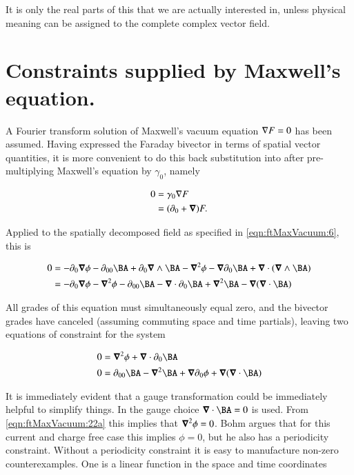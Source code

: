 It is only the real parts of this that we are actually interested in, unless physical meaning can be assigned to the complete complex vector field.

\section{Constraints supplied by Maxwell's equation.}

A Fourier transform solution of Maxwell's vacuum equation $\nabla F = 0$ has been assumed.  Having expressed the Faraday bivector in terms of spatial vector quantities, it is more convenient to do this back substitution into after pre-multiplying Maxwell's equation by $\gamma_0$, namely

\begin{align}
\label{eqn:ftMaxVacuum:20}
0
&= \gamma_0 \nabla F \\
&= (\partial_0 + \boldsymbol{\nabla}) F.
\end{align}

Applied to the spatially decomposed field as specified in \autoref{eqn:ftMaxVacuum:6}, this is

\begin{align*}
0
&=
-\partial_0 \spacegrad \phi
-\partial_{00} \BA
+ \partial_0 \spacegrad \wedge \BA
-\spacegrad^2 \phi
- \spacegrad \partial_0 \BA
+ \spacegrad \cdot (\spacegrad \wedge \BA ) \\
&=
- \partial_0 \spacegrad \phi - \spacegrad^2 \phi
- \partial_{00} \BA
- \spacegrad \cdot \partial_0 \BA
+ \spacegrad^2 \BA 
- \spacegrad (\spacegrad \cdot \BA ) \\
\end{align*}

All grades of this equation must simultaneously equal zero, and the bivector grades have canceled (assuming commuting space and time partials), leaving two equations of constraint for the system

\begin{subequations}
\label{eqn:ftMaxVacuum:22}
\begin{align}
0 &=
\spacegrad^2 \phi + \spacegrad \cdot \partial_0 \BA
\label{eqn:ftMaxVacuum:22a}
\\
0 &=
\partial_{00} \BA - \spacegrad^2 \BA
+ \spacegrad \partial_0 \phi 
+ \spacegrad ( \spacegrad \cdot \BA )
\label{eqn:ftMaxVacuum:22b}
\end{align}
\end{subequations}

It is immediately evident that a gauge transformation could be immediately helpful to simplify things.  In \cite{bohm1989qt} the gauge choice $\spacegrad \cdot \BA = 0$ is used.  From \autoref{eqn:ftMaxVacuum:22a} this implies that $\boldsymbol{\nabla}^2 \phi = 0$.  Bohm argues that for this current and charge free case this implies $\phi = 0$, but he also has a periodicity constraint.  Without a periodicity constraint it is easy to manufacture non-zero counterexamples.  One is a linear function in the space and time coordinates

